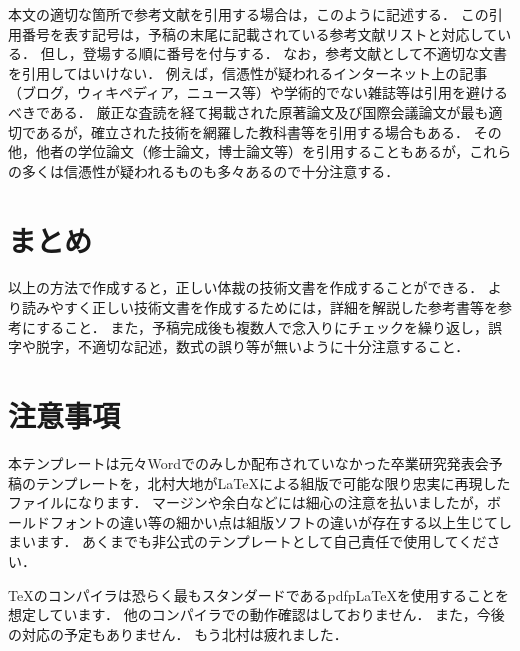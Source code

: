 \documentclass[a4j]{jsarticle}
\begin{document}
本文の適切な箇所で参考文献を引用する場合は，このように記述する\cite{sample1}．
この引用番号を表す記号は，予稿の末尾に記載されている参考文献リストと対応している\cite{sample2}．
但し，登場する順に番号を付与する．
なお，参考文献として不適切な文書を引用してはいけない．
例えば，信憑性が疑われるインターネット上の記事（ブログ，ウィキペディア，ニュース等）や学術的でない雑誌等は引用を避けるべきである．
厳正な査読を経て掲載された原著論文及び国際会議論文が最も適切であるが，確立された技術を網羅した教科書等を引用する場合もある．
その他，他者の学位論文（修士論文，博士論文等）を引用することもあるが，これらの多くは信憑性が疑われるものも多々あるので十分注意する．

\section{まとめ}

以上の方法で作成すると，正しい体裁の技術文書を作成することができる．
より読みやすく正しい技術文書を作成するためには，詳細を解説した参考書等を参考にすること．
また，予稿完成後も複数人で念入りにチェックを繰り返し，誤字や脱字，不適切な記述，数式の誤り等が無いように十分注意すること．

\section{注意事項}

本テンプレートは元々Wordでのみしか配布されていなかった卒業研究発表会予稿のテンプレートを，北村大地がLaTeXによる組版で可能な限り忠実に再現したファイルになります．
マージンや余白などには細心の注意を払いましたが，ボールドフォントの違い等の細かい点は組版ソフトの違いが存在する以上生じてしまいます．
あくまでも非公式のテンプレートとして自己責任で使用してください．

TeXのコンパイラは恐らく最もスタンダードであるpdfpLaTeXを使用することを想定しています．
他のコンパイラでの動作確認はしておりません．
また，今後の対応の予定もありません．
もう北村は疲れました．
\end{document}
